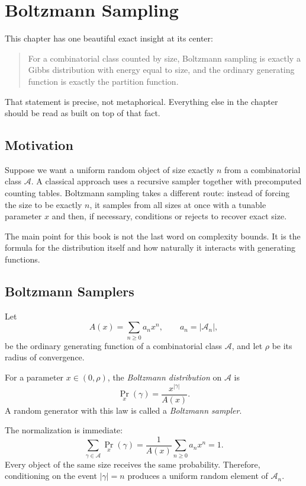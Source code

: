 \chapter{Boltzmann Sampling}
\label{ch13}

This chapter has one beautiful exact insight at its center:
\begin{quote}
For a combinatorial class counted by size, Boltzmann sampling is exactly a Gibbs distribution with energy equal to size, and the ordinary generating function is exactly the partition function.
\end{quote}
That statement is precise, not metaphorical. Everything else in the chapter should be read as built on top of that fact.

\section{Motivation}

Suppose we want a uniform random object of size exactly $n$ from a combinatorial class $\mathcal{A}$. A classical approach uses a recursive sampler together with precomputed counting tables. Boltzmann sampling takes a different route: instead of forcing the size to be exactly $n$, it samples from all sizes at once with a tunable parameter $x$ and then, if necessary, conditions or rejects to recover exact size.

The main point for this book is not the last word on complexity bounds. It is the formula for the distribution itself and how naturally it interacts with generating functions.

\section{Boltzmann Samplers}

Let
\[
  A(x)=\sum_{n \ge 0} a_n x^n,
  \qquad a_n = |\mathcal{A}_n|,
\]
be the ordinary generating function of a combinatorial class $\mathcal{A}$, and let $\rho$ be its radius of convergence.

\begin{definition}
For a parameter $x \in (0,\rho)$, the \emph{Boltzmann distribution} on $\mathcal{A}$ is
\[
  \Pr_x(\gamma) = \frac{x^{|\gamma|}}{A(x)}.
\]
A random generator with this law is called a \emph{Boltzmann sampler}.
\end{definition}

The normalization is immediate:
\[
  \sum_{\gamma \in \mathcal{A}} \Pr_x(\gamma)
  = \frac{1}{A(x)} \sum_{n \ge 0} a_n x^n = 1.
\]
Every object of the same size receives the same probability. Therefore, conditioning on the event $|\gamma|=n$ produces a uniform random element of $\mathcal{A}_n$.

